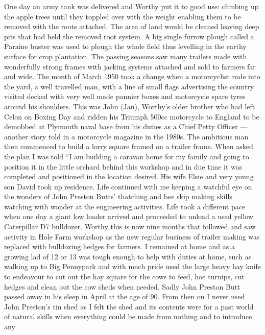 
\here

One day an army tank was delivered and Worthy put it to good use: climbing up
the apple trees until they toppled over with the weight enabling them to be
removed with the roots attached. The area of land would be cleaned leaving deep
pits that had held the removed root system. A big single furrow plough called a
Paraine buster was used to plough the whole field thus levelling in the earthy
surface for crop plantation. The passing seasons saw many trailers made with
wonderfully strong frames with jacking systems attached and sold to farmers far
and wide. The month of March 1950 took a change when a motorcyclist rode into
the yard, a well travelled man, with a line of small flags advertising the
country visited decked with very well made pannier boxes and motorcycle spare
tyres around his shoulders. This was John (Jan), Worthy's older brother who had
left Celon on Boxing Day and ridden his Triumph 500cc motorcycle to England to
be demobbed at Plymouth naval base from his duties as a Chief Petty Officer ---
another story told in a motorcycle magazine in the 1980s. The ambitious man
then commenced to build a lorry square framed on a trailer frame. When asked
the plan I was told ``I am building a caravan home for my family and going to
position it in the little orchard behind this workshop and in due time it was
completed and positioned in the location desired. His wife Elsie and very young
son David took up residence. Life continued with me keeping a watchful eye on
the wonders of John Preston Butts' thatching and bee skip making skills
watching with wonder at the engineering activities. Life took a different pace
when one day a giant low loader arrived and proceeded to unload a used yellow
Caterpillar D7 bulldozer. Worthy this is now nine months that followed and saw
activity in Hole Farm workshop as the new regular business of trailer making
was replaced with bulldozing hedges for farmers. I remained at home and as a
growing lad of 12 or 13 was tough enough to help with duties at home, such as
walking up to Big Pennypark and with much pride used the large heavy hay knife
to endeavour to cut out the hay square for the cows to feed, hoe turnips, cut
hedges and clean out the cow sheds when needed. Sadly John Preston Butt passed
away in his sleep in April at the age of 90. From then on I never used John
Preston's tin shed as I felt the shed and its contents were for a past world of
natural skills when everything could be made from nothing and to introduce any
